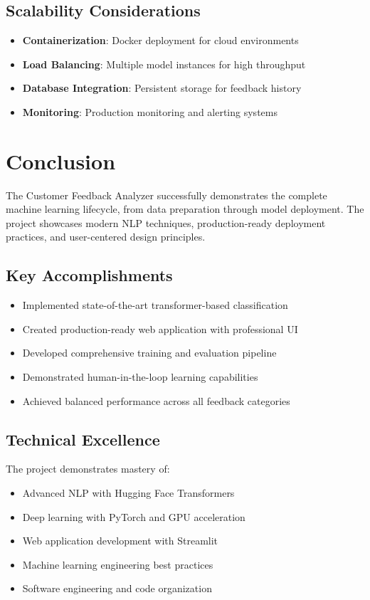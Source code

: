 \documentclass[11pt,a4paper]{article}
\begin{document}
\subsection{Scalability Considerations}
\begin{itemize}
  \item \textbf{Containerization}: Docker deployment for cloud environments
  \item \textbf{Load Balancing}: Multiple model instances for high throughput
  \item \textbf{Database Integration}: Persistent storage for feedback history
  \item \textbf{Monitoring}: Production monitoring and alerting systems
\end{itemize}

\section{Conclusion}

The Customer Feedback Analyzer successfully demonstrates the complete machine learning lifecycle, from data preparation through model deployment. The project showcases modern NLP techniques, production-ready deployment practices, and user-centered design principles.

\subsection{Key Accomplishments}
\begin{itemize}
  \item Implemented state-of-the-art transformer-based classification
  \item Created production-ready web application with professional UI
  \item Developed comprehensive training and evaluation pipeline
  \item Demonstrated human-in-the-loop learning capabilities
  \item Achieved balanced performance across all feedback categories
\end{itemize}

\subsection{Technical Excellence}
The project demonstrates mastery of:
\begin{itemize}
  \item Advanced NLP with Hugging Face Transformers
  \item Deep learning with PyTorch and GPU acceleration
  \item Web application development with Streamlit
  \item Machine learning engineering best practices
  \item Software engineering and code organization
\end{itemize}
\end{document}
